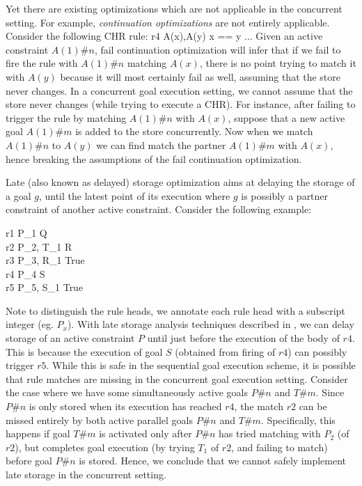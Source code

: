 \documentclass{tlp}
\begin{document}
Yet there are existing optimizations which are not applicable in the concurrent setting. For example,
{\em continuation optimizations} \cite{greg:thesis,DBLP:conf/iclp/Schrijvers05} are not entirely applicable. 
Consider the following CHR rule:
  r4 \atsign A(x),A(y) \simparrow x == y \mid ...
\eda
Given an active constraint $A(1)\#n$, fail continuation optimization will infer that if we fail to fire the
rule with $A(1)\#n$ matching $A(x)$, there is no point trying to match it with $A(y)$ because it will most
certainly fail as well, assuming that the store never changes. In a concurrent goal execution setting, we
cannot assume that the store never changes (while trying to execute a CHR). For instance, after failing to 
trigger the rule by matching $A(1)\#n$ with $A(x)$, suppose that a new active goal $A(1)\#m$ is added to 
the store concurrently. Now when we match $A(1)\#n$ to $A(y)$ we can find match the partner $A(1)\#m$ with 
$A(x)$, hence breaking the assumptions of the fail continuation optimization.



Late (also known as delayed) storage optimization \cite{greg:thesis} aims at delaying the storage of a goal $g$, until the 
latest point of its execution where $g$ is possibly a partner constraint of another active constraint.
Consider the following example:

r1 \atsign P_1 \proparrow Q \\
r2 \atsign P_2, T_1 \simparrow R \\
r3 \atsign P_3, R_1 \simparrow True \\
r4 \atsign P_4 \proparrow S \\
r5 \atsign P_5, S_1 \simparrow True
\eda

Note to distinguish the rule heads, we annotate each rule head with a subscript integer (eg. $P_x$).
With late storage analysis techniques described in \cite{greg:thesis}, we can delay storage of an active
constraint $P$ until just before the execution of the body of $r4$. This is because the execution of
goal $S$ (obtained from firing of $r4$) can possibly trigger $r5$. While this is safe in the sequential
goal execution scheme, it is possible that rule matches are missing in the concurrent goal execution
setting. Consider the case where we have some simultaneously active goals $P\#n$ and $T\#m$. Since $P\#n$ is 
only stored when its execution has reached $r4$, the match $r2$ can be missed entirely by both active 
parallel goals $P\#n$ and $T\#m$. Specifically, this happens if goal $T\#m$ is activated only after 
$P\#n$ has tried matching with $P_2$ (of $r2$), but completes goal execution (by trying $T_1$ of $r2$,
and failing to match) before goal $P\#n$ is stored. Hence, we conclude that we cannot safely implement
late storage in the concurrent setting.
\end{document}
